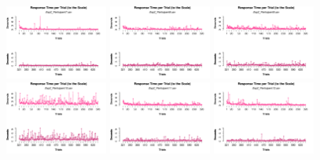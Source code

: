 \begin{figure}[th]
\includegraphics[width=0.30\textwidth]{Figures/RT2_Exp2_P7} \includegraphics[width=0.30\textwidth]{Figures/RT2_Exp2_P8} \includegraphics[width=0.30\textwidth]{Figures/RT2_Exp2_P9}
\includegraphics[width=0.30\textwidth]{Figures/RT2_Exp2_P10} \includegraphics[width=0.30\textwidth]{Figures/RT2_Exp2_P11} \includegraphics[width=0.30\textwidth]{Figures/RT2_Exp2_P12}

\end{figure}
